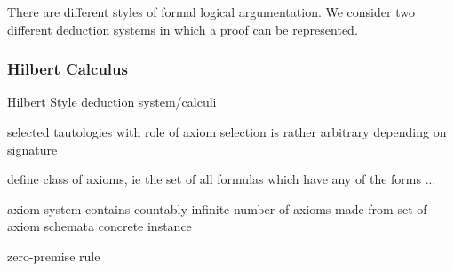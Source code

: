 
            There are different styles of formal logical argumentation. We consider two different deduction systems in which a proof can be represented.
            


                

            \subsubsection{Hilbert Calculus}
                \label{sec:hilbert-calculus}

                Hilbert Style deduction system/calculi

                selected tautologies with role of axiom
                selection is rather arbitrary
                depending on signature

                define class of axioms, ie the set of all formulas which have any of the forms ...

                axiom system contains countably infinite number of axioms
                made from set of axiom schemata
                concrete instance


                zero-premise rule

